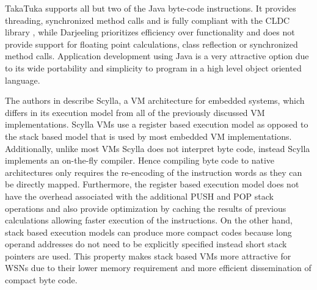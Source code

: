 TakaTuka \cite{Aslam:2008:ITJ:1460412.1460472} supports all but two of the Java byte-code instructions.  It provides threading, synchronized method calls and is fully compliant with the CLDC library \cite{debbabi2006security}, while Darjeeling \cite{Brouwers:2009:DFV:1644038.1644056} prioritizes efficiency over functionality and does not provide support for floating point calculations, class reflection or synchronized method calls. 
Application development using Java is a very attractive option due to its wide portability and simplicity to program in a high level object oriented language.

The authors in \cite{895380} describe Scylla, a VM architecture for embedded systems, which differs in its execution model from all of the previously discussed VM implementations. Scylla VMs use a register based execution model as opposed to the stack based model that is used by most embedded VM implementations. Additionally, unlike most VMs Scylla does not interpret byte code, instead Scylla implements an on-the-fly compiler. Hence compiling byte code to native architectures only requires the re-encoding of the instruction words as they can be directly mapped. Furthermore, the register based execution model does not have the overhead associated with the additional PUSH and POP stack operations and also provide optimization by caching the results of previous calculations allowing faster execution of the instructions. On the other hand, stack based execution models can produce more compact codes because long operand addresses do not need to be explicitly specified instead short stack pointers are used. This property makes stack based VMs more attractive for WSNs due to their lower memory requirement and more efficient dissemination of compact byte code. 